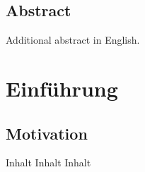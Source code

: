 \documentclass[
	ngerman,
	ruledheaders=section,%
	class=report,%
	thesis={type=Projektseminararbeit},%
	accentcolor=2c, %
	custommargins=false,
	marginpar=false,
	BCOR=10mm, %
	parskip=half-, %
	fontsize=11pt, %
  	twoside,
  	numbers=noendperiod,
  	fleqn,
  	captions=oneline, %
  	IMRAD=false,
]{tudapub}
\begin{document}
\section*{Abstract}
	Additional abstract in English.	

\cleardoublepage

\tableofcontents
\cleardoublepage

\mainmatter

\chapter{Einführung}

\section{Motivation}

Inhalt Inhalt Inhalt \cite{Duden}





\appendix %


\cleardoublepage        %
\printbibliography 

	
\end{document}
